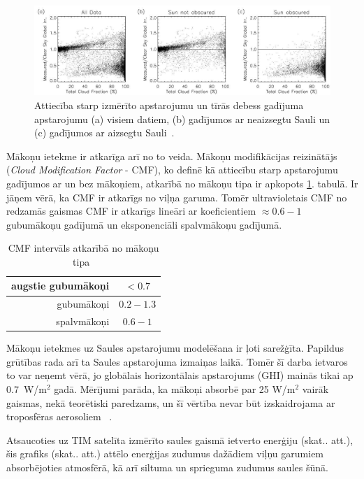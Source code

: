 \begin{figure}[h]
	\centering
	\includegraphics[width=\linewidth]{figures/misc/makoni_ietekme.jpg}
	\caption{Attiecība starp izmērīto apstarojumu un tīrās debess gadījuma apstarojumu (a) visiem datiem, (b) gadījumos ar neaizsegtu Sauli un (c) gadījumos ar aizsegtu Sauli~\cite{CloudCoverageImpactOnIrradiance}.}
	\label{fig:makoni_ietekme}
\end{figure}

Mākoņu ietekme ir atkarīga arī no to veida. Mākoņu modifikācijas reizinātājs (\textit{Cloud Modification Factor} - CMF), ko definē kā attiecību starp apstarojumu gadījumos ar un bez mākoņiem, atkarībā no mākoņu tipa ir apkopots \ref{tab:CMF}. tabulā. Ir jāņem vērā, ka CMF ir atkarīgs no viļņa garuma. Tomēr ultravioletais CMF no redzamās gaismas CMF ir atkarīgs lineāri ar koeficientiem $\approx0.6-1$ gubumākoņu gadījumā un eksponenciāli spalvmākoņu gadījumā.
\begin{table}[h]
	\caption{CMF intervāls atkarībā no mākoņu tipa~\cite{effectCloudsOnSurface}}
	\begin{center}
		\begin{tabular}{| r | c |}
			\hline
			augstie gubumākoņi & $<0.7$     \\ \hline
			gubumākoņi         & $0.2-1.3$ \\ \hline
			spalvmākoņi        & $0.6-1$    \\ \hline
		\end{tabular}
	\end{center}
	\label{tab:CMF}
\end{table}

Mākoņu ietekmes uz Saules apstarojumu modelēšana ir ļoti sarežģīta. Papildus grūtības rada arī ta Saules apstarojuma izmaiņas laikā. Tomēr šī darba ietvaros to var neņemt vērā, jo globālais horizontālais apstarojums (GHI) mainās tikai ap 0.7~W/m$^2$ gadā. Mērījumi parāda, ka mākoņi absorbē par 25 W/m$^2$ vairāk gaismas, nekā teorētiski paredzams, un šī vērtība nevar būt izskaidrojama ar troposfēras aerosoliem ~\cite{observVSModel}.

Atsaucoties uz TIM satelīta izmērīto saules gaismā ietverto enerģiju (skat.\label{fig:SSI}. att.), šis grafiks (skat.\label{fig:energyLoss}. att.) attēlo enerģijas zudumus dažādiem viļņu garumiem absorbējoties atmosfērā, kā arī siltuma un sprieguma zudumus saules šūnā.

